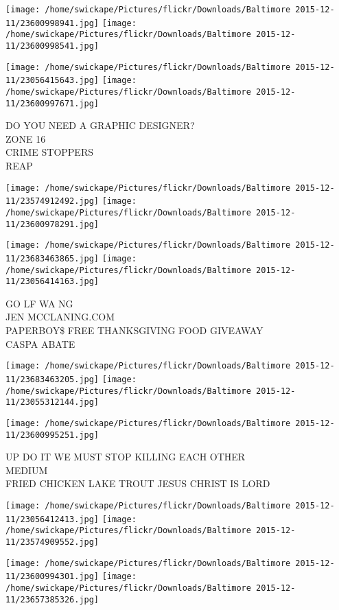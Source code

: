 \documentclass[10pt,letterpaper]{article}
\begin{document}
\texttt{[image: /home/swickape/Pictures/flickr/Downloads/Baltimore 2015-12-11/23600998941.jpg]}
\texttt{[image: /home/swickape/Pictures/flickr/Downloads/Baltimore 2015-12-11/23600998541.jpg]}

\texttt{[image: /home/swickape/Pictures/flickr/Downloads/Baltimore 2015-12-11/23056415643.jpg]}
\texttt{[image: /home/swickape/Pictures/flickr/Downloads/Baltimore 2015-12-11/23600997671.jpg]}

DO YOU NEED A GRAPHIC DESIGNER?\\
ZONE 16\\
CRIME STOPPERS\\
REAP
\pagebreak

\texttt{[image: /home/swickape/Pictures/flickr/Downloads/Baltimore 2015-12-11/23574912492.jpg]}
\texttt{[image: /home/swickape/Pictures/flickr/Downloads/Baltimore 2015-12-11/23600978291.jpg]}

\texttt{[image: /home/swickape/Pictures/flickr/Downloads/Baltimore 2015-12-11/23683463865.jpg]}
\texttt{[image: /home/swickape/Pictures/flickr/Downloads/Baltimore 2015-12-11/23056414163.jpg]}

GO LF WA NG\\
JEN MCCLANING.COM\\
PAPERBOY\$ FREE THANKSGIVING FOOD GIVEAWAY\\
CASPA ABATE
\pagebreak

\texttt{[image: /home/swickape/Pictures/flickr/Downloads/Baltimore 2015-12-11/23683463205.jpg]}
\texttt{[image: /home/swickape/Pictures/flickr/Downloads/Baltimore 2015-12-11/23055312144.jpg]}

\vspace{0.25in}
\texttt{[image: /home/swickape/Pictures/flickr/Downloads/Baltimore 2015-12-11/23600995251.jpg]}

UP DO IT WE MUST STOP KILLING EACH OTHER\\
MEDIUM\\
FRIED CHICKEN LAKE TROUT JESUS CHRIST IS LORD
\pagebreak

\texttt{[image: /home/swickape/Pictures/flickr/Downloads/Baltimore 2015-12-11/23056412413.jpg]}
\texttt{[image: /home/swickape/Pictures/flickr/Downloads/Baltimore 2015-12-11/23574909552.jpg]}

\texttt{[image: /home/swickape/Pictures/flickr/Downloads/Baltimore 2015-12-11/23600994301.jpg]}
\texttt{[image: /home/swickape/Pictures/flickr/Downloads/Baltimore 2015-12-11/23657385326.jpg]}
\end{document}
